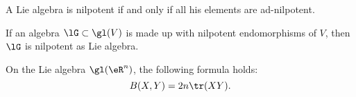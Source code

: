 \begin{theorem}\label{tho:Engel}
	A Lie algebra is nilpotent if and only if all his elements are ad-nilpotent.
\end{theorem}



\begin{proposition}\label{PropBDrongP}
	If an algebra $\lG\subset\gl(V)$ is made up with nilpotent endomorphisms of $V$, then $\lG$ is nilpotent as Lie algebra.
\end{proposition}

\begin{proposition} \label{PropKillingTraceDeuxn}
	On the Lie algebra \( \gl(\eR^n)\), the following formula holds:
	\begin{equation}
		B(X,Y)=2n\tr(XY).
	\end{equation}
\end{proposition}

